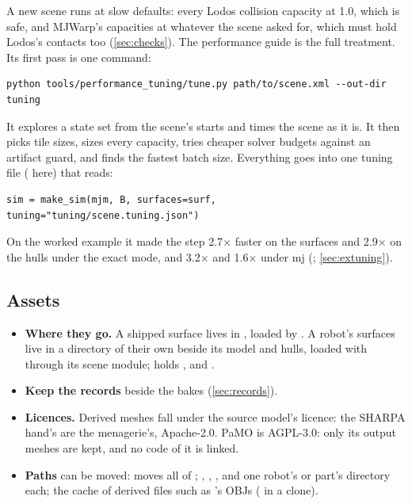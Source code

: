 A new scene runs at slow defaults: every Lodos collision capacity at 1.0, which is safe, and MJWarp's capacities at whatever the scene asked for, which must hold Lodos's contacts too (\cref{sec:checks}). The performance guide is the full treatment. Its first pass is one command:

\begin{lstlisting}
python tools/performance_tuning/tune.py path/to/scene.xml --out-dir tuning
\end{lstlisting}

It explores a state set from the scene's starts and times the scene as it is. It then picks tile sizes, sizes every capacity, tries cheaper solver budgets against an artifact guard, and finds the fastest batch size. Everything goes into one tuning file ( here) that  reads:

\begin{lstlisting}
sim = make_sim(mjm, B, surfaces=surf, tuning="tuning/scene.tuning.json")
\end{lstlisting}

On the worked example it made the step 2.7$\times$ faster on the surfaces and 2.9$\times$ on the hulls under the exact mode, and 3.2$\times$ and 1.6$\times$ under mj (; \cref{sec:extuning}).

\subsection{Assets}\label{sec:assets}

\begin{itemize}
\item \textbf{Where they go.} A shipped surface lives in , loaded by . A robot's surfaces live in a directory of their own beside its model and hulls, loaded with  through its scene module;  holds ,  and .
\item \textbf{Keep the records} beside the bakes (\cref{sec:records}).
\item \textbf{Licences.} Derived meshes fall under the source model's licence: the SHARPA hand's are the menagerie's, Apache-2.0. PaMO is AGPL-3.0: only its output meshes are kept, and no code of it is linked.
\item \textbf{Paths} can be moved:  moves all of ; , , ,  and  one robot's or part's directory each;  the cache of derived files such as 's OBJs ( in a clone).
\end{itemize}

